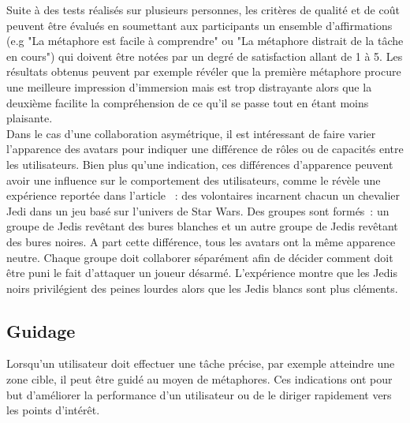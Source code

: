\documentclass[11pt]{article}
\begin{document}
Suite à des tests réalisés sur plusieurs personnes, les critères de qualité et de coût peuvent être évalués en soumettant aux participants un ensemble d'affirmations (e.g "La métaphore est facile à comprendre" ou "La métaphore distrait de la tâche en cours") qui doivent être notées par un degré de satisfaction allant de 1 à 5. Les résultats obtenus peuvent par exemple révéler que la première métaphore procure une meilleure impression d'immersion mais est trop distrayante alors que la deuxième facilite la compréhension de ce qu'il se passe tout en étant moins plaisante.
\\

Dans le cas d'une collaboration asymétrique, il est intéressant de faire varier l'apparence des avatars pour indiquer une différence de rôles ou de capacités entre les utilisateurs. Bien plus qu'une indication, ces différences d'apparence peuvent avoir une influence sur le comportement des utilisateurs, comme le révèle une expérience reportée dans l'article \cite{jedi}~: des volontaires incarnent chacun un chevalier Jedi dans un jeu basé sur l'univers de Star Wars. Des groupes sont formés~: un groupe de Jedis revêtant des bures blanches et un autre groupe de Jedis revêtant des bures noires. A part cette différence, tous les avatars ont la même apparence neutre. Chaque groupe doit collaborer séparément afin de décider comment doit être puni le fait d'attaquer un joueur désarmé. L'expérience montre que les Jedis noirs privilégient des peines lourdes alors que les Jedis blancs sont plus cléments.

\subsection{Guidage}
\label{subsec:facilitation}
Lorsqu'un utilisateur doit effectuer une tâche précise, par exemple atteindre une zone cible, il peut être guidé au moyen de métaphores. Ces indications ont pour but d'améliorer la performance d'un utilisateur ou de le diriger rapidement vers les points d'intérêt.
\\
\end{document}
